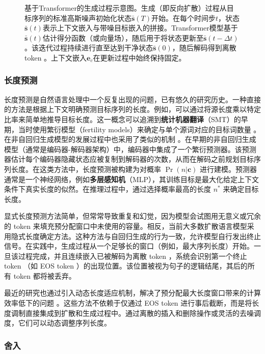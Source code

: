 \begin{figure}[!t]
\centering
{}
\caption{基于Transformer的生成过程示意图。生成（即反向扩散）过程从目标序列的标准高斯噪声初始化状态$\bar{\mathbf{s}}(T)$开始。在每个时间步$t$，状态$\bar{\mathbf{s}}(t)$表示上下文嵌入与带噪目标嵌入的拼接。Transformer模型基于$\bar{\mathbf{s}}(t)$估计得分函数（或向量场），随后用于将状态更新至$\bar{\mathbf{s}}(t-\Delta t)$。该迭代过程持续进行直至达到干净状态$\bar{\mathbf{s}}(0)$，随后解码得到离散 token 。上下文嵌入$\mathbf{e}_c$在更新过程中始终保持固定。}
\label{fig:transformer-based-generation-process}
\end{figure}
\subsubsection{长度预测}

长度预测是自然语言处理中一个反复出现的问题，已有悠久的研究历史。一种直接的方法是根据上下文明确预测目标序列的长度。例如，可以通过将源长度乘以特定比率来简单地推导目标长度。这一概念可以追溯到\textbf{统计机器翻译}（SMT）的早期，当时使用繁衍模型（fertility
models）来确定与单个源词对应的目标词数量 \citep{brown-etal:1993mathematics}。在非自回归生成模型的发展过程中也采用了类似的机制 \citep{xiao-etal:2023survey}。在早期的非自回归生成模型（通常是编码器-解码器架构）中，编码器中集成了一个繁衍预测器。该预测器估计每个编码器隐藏状态应被复制到解码器的次数，从而在解码之前规划目标序列长度。在这类方法中，长度预测被构建为对概率 $\Pr(n|\mathbf{c})$ 进行建模。预测器通常是一个神经网络，例如\textbf{多层感知机}（MLP），其训练目标是最大化给定上下文条件下真实长度的似然。在推理过程中，通过选择概率最高的长度 $n^*$ 来确定目标长度。

显式长度预测方法简单，但常常导致重复和幻觉，因为模型会试图用无意义或冗余的 token 来填充预分配窗口中未使用的容量。相反，当前大多数扩散语言模型采用隐式长度确定方法。这种方法与自回归生成的行为一致，允许模型自行发出终止信号。在实践中，生成过程从一个足够长的窗口（例如，最大序列长度）开始。一旦该过程完成，并且连续嵌入已被解码为离散 token ，系统会识别第一个终止 token （如 EOS token ）的出现位置。该位置被视为句子的逻辑结尾，其后的所有 token 都将被丢弃。

最近的研究也通过引入动态长度适应机制，解决了预分配最大长度窗口带来的计算效率低下的问题 \citep{li-etal:2025fixed,yang-etal:2025diffusion}。这些方法不依赖于仅通过 EOS token 进行事后截断，而是将长度调制直接集成到扩散和生成过程中。通过离散的插入和删除操作或灵活的去噪调度，它们可以动态调整序列长度。
\subsubsection{舍入}

